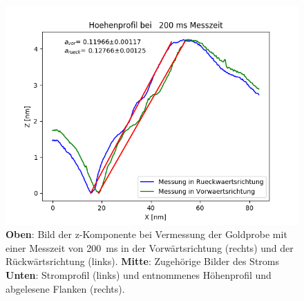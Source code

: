 \documentclass[12pt,a4paper]{article}
\begin{document}
\begin{figure}[H]
\includegraphics[scale=0.5]{Bilder/Anhang/Zeit/Profil_Zeit_200.png}
\caption{\textbf{Oben}: Bild der z-Komponente bei Vermessung der Goldprobe mit einer Messzeit von \SI{200}{ms} in der Vorwärtsrichtung (rechts) und der Rückwärtsrichtung (links). \textbf{Mitte}: Zugehörige Bilder des Stroms \textbf{Unten}: Stromprofil (links) und entnommenes Höhenprofil und abgelesene Flanken (rechts).}
\end{figure}
\end{document}
